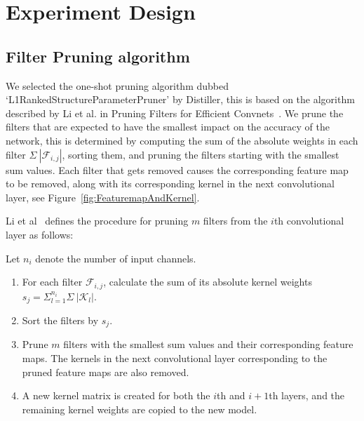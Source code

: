 \documentclass[../Dissertation.tex]{subfiles}
\begin{document}
\newpage

\section{Experiment Design}\label{sec:ExperimentDesign}

\subsection{Filter Pruning algorithm}\label{sec:FilterPruningAlgo}
We selected the one-shot pruning algorithm dubbed `L1RankedStructureParameterPruner' by Distiller, this is based on the algorithm described by Li et al. in Pruning Filters for Efficient Convnets~\autocite{liPruningFiltersEfficient2017}. 
We prune the filters that are expected to have the smallest impact on the accuracy of the network, this is determined by computing the sum of the absolute weights in each filter $\Sigma~|\mathcal{F}_{i,j}|$, sorting them, and pruning the filters starting with the smallest sum values.
Each filter that gets removed causes the corresponding feature map to be removed, along with its corresponding kernel in the next convolutional layer, see Figure~\ref{fig:FeaturemapAndKernel}. \\


\begin{singlespace}
\noindent Li et al~\autocite{liPruningFiltersEfficient2017} defines the procedure for pruning $m$ filters from the $i$th convolutional layer as follows:

\noindent Let $n_i$ denote the number of input channels.
    \begin{enumerate}
        \item For each filter $\mathcal{F}_{i,j}$, calculate the sum of its absolute kernel weights $s_{j} = \Sigma_{l=1}^{n_{i}}\Sigma~|\mathcal{K}_{l}|$.
        \item Sort the filters by $s_j$.
        \item Prune $m$ filters with the smallest sum values and their corresponding feature maps. The kernels in the next convolutional layer corresponding to the pruned feature maps are also removed.
        \item A new kernel matrix is created for both the $i$th and $i + 1$th layers, and the remaining kernel weights are copied to the new model.
    \end{enumerate}
\end{singlespace}
\end{document}
